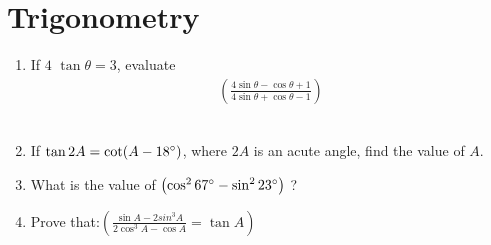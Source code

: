 \documentclass{article}
\providecommand{\brak}[1]{\ensuremath{\left(#1\right)}}
\begin{document}
		\section{Trigonometry}
		\begin{enumerate}[label=(\roman*)]
			\item If $4$ $\tan\theta=3$, evaluate \begin{align*}\brak {\frac{4 \sin\theta - \cos\theta + 1 }{ 4 \sin\theta + \cos\theta - 1 } } \end{align*}   \\
\item If $\tan2A = \cot(A-18\degree)$, where $2A$ is an acute angle, find the value of $A$.
\item What is the value of $ \brak{\cos^2 67\degree - \sin^2 23\degree}$ ?
\item  Prove that:$\brak{\frac{\sin A - 2sin^3 A}{2 \cos^3 A-\cos A} = \tan A }$
\end{enumerate}
\end{document}
